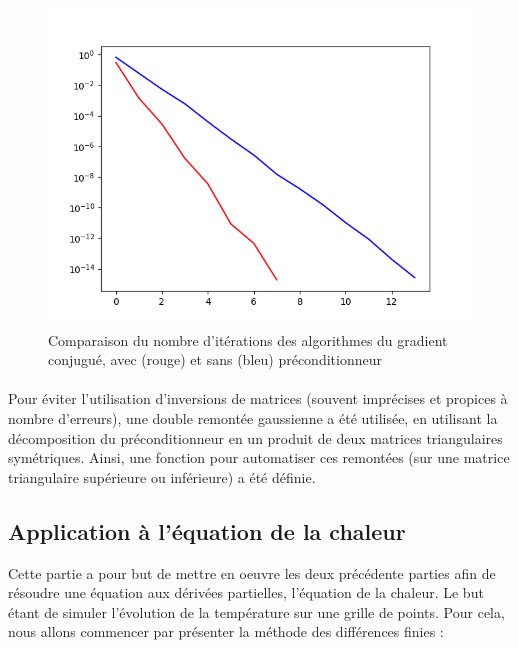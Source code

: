 \documentclass{article}
\begin{document}
\begin{figure}[ht]
    \centering
    \includegraphics[width=0.7\columnwidth]{conjgrad_comp.png}
    \caption{Comparaison du nombre d'itérations des algorithmes du gradient conjugué, avec (rouge) et sans (bleu) préconditionneur}
    \label{fig:conj_precond}
\end{figure}

\paragraph{}
    Pour éviter l'utilisation d'inversions de matrices (souvent imprécises et propices à nombre d'erreurs), une double remontée gaussienne a été utilisée, en utilisant la décomposition du préconditionneur en un produit de deux matrices triangulaires symétriques. Ainsi, une fonction pour automatiser ces remontées (sur une matrice triangulaire supérieure ou inférieure) a été définie.
    
    
\subsection*{Application à l’équation de la chaleur}
    Cette partie a pour but de mettre en oeuvre les deux précédente parties 
    afin de résoudre une équation aux dérivées partielles, l'équation de la chaleur. 
    Le but étant de simuler l'évolution de la température sur une grille de points. Pour cela, nous allons commencer par présenter la méthode des différences finies : 
\end{document}
